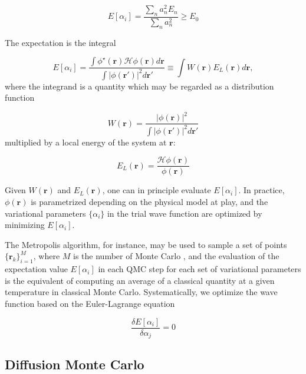 \documentclass[10pt, twocolumn, twoside]{article}
\begin{document}
\begin{equation}
E[\alpha_i] = \frac{\sum_n a_n^2 E_n}{\sum_n a_n^2 } \ge E_0
\end{equation}

The expectation is the integral

\begin{equation}
E[\alpha_i] = \frac{\int \phi^\star (\bm r) \mathcal{H} \phi (\bm r) d\bm r}{\int | \phi (\bm r') |^2 d\bm r'} \equiv \int W(\bm r) E_L(\bm r) d\bm r ,
\end{equation}
where the integrand is a quantity which may be regarded as a distribution function 

\begin{equation}
W(\bm r) = \frac{|\phi (\bm r)|^2}{\int |\phi(\bm r')|^2 d\bm r'}
\end{equation}
multiplied by a local energy of the system at $\bm r$:

\begin{equation}
 E_L(\bm r) = \frac{\mathcal{H}\phi(\bm r)}{\phi (\bm r)}
\end{equation}

Given $W(\bm r)$ and $E_L(\bm r)$, one can in principle evaluate $E[\alpha_i]$. In practice, $\phi (\bm r) $ is parametrized depending on the physical model at play, and the variational parameters $\{\alpha_i\}$ in the trial wave function are optimized by minimizing $E[\alpha_i]$.\par

The Metropolis algorithm, for instance, may be used to sample a set of points $\{\bm r_k\}_{i=1}^M$, where $M$ is the number of Monte Carlo , and the evaluation of the expectation value $E[\alpha_i]$ in each QMC step for each set of variational parameters is the equivalent of computing an average of a classical quantity at a given temperature in classical Monte Carlo. Systematically, we optimize the wave function based on the Euler-Lagrange equation

\begin{equation}
\frac{\delta E[\alpha_i]}{\delta \alpha_j} = 0
\end{equation}

\subsection{Diffusion Monte Carlo}\label{subsec:dmc}\paragraph{}
\end{document}
